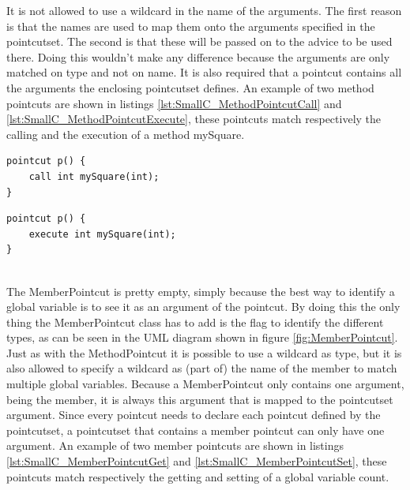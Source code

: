 \documentclass[a4paper]{report}
\begin{document}
It is not allowed to use a wildcard in the name of the arguments. The first reason is that the names are used to map them onto the arguments specified in the pointcutset. The second is that these will be passed on to the advice to be used there. Doing this wouldn't make any difference because the arguments are only matched on type and not on name. It is also required that a pointcut contains all the arguments the enclosing pointcutset defines. An example of two method pointcuts are shown in listings \ref{lst:SmallC_MethodPointcutCall} and \ref{lst:SmallC_MethodPointcutExecute}, these pointcuts match respectively the calling and the execution of a method mySquare.\\
\begin{minipage}{0.42\textwidth}
\begin{lstlisting}[caption=Example of a method call pointcut., label=lst:SmallC_MethodPointcutCall]
pointcut p() {
	call int mySquare(int);
}
\end{lstlisting}
\end{minipage}\hfill
\begin{minipage}{0.42\textwidth}
\begin{lstlisting}[caption=Example of a method execution pointcut., label=lst:SmallC_MethodPointcutExecute]
pointcut p() {
	execute int mySquare(int);
}
\end{lstlisting}
\end{minipage}
\\
The MemberPointcut is pretty empty, simply because the best way to identify a global variable is to see it as an argument of the pointcut. By doing this the only thing the MemberPointcut class has to add is the flag to identify the different types, as can be seen in the UML diagram shown in figure \ref{fig:MemberPointcut}. Just as with the MethodPointcut it is possible to use a wildcard as type, but it is also allowed to specify a wildcard as (part of) the name of the member to match multiple global variables. Because a MemberPointcut only contains one argument, being the member, it is always this argument that is mapped to the pointcutset argument. Since every pointcut needs to declare each pointcut defined by the pointcutset, a pointcutset that contains a member pointcut can only have one argument. An example of two member pointcuts are shown in listings \ref{lst:SmallC_MemberPointcutGet} and \ref{lst:SmallC_MemberPointcutSet}, these pointcuts match respectively the getting and setting of a global variable count.\\
\end{document}
